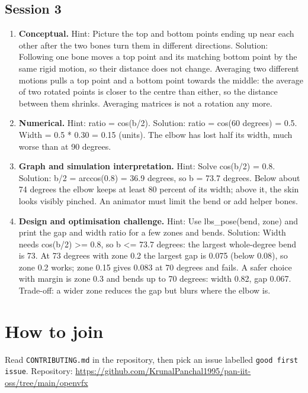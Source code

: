 \documentclass[11pt,a4paper]{article}
\begin{document}
\subsection*{Session 3}
\begin{enumerate}[nosep]
\item \textbf{Conceptual.} Hint: Picture the top and bottom points ending up near each other after the two bones turn them in different directions. Solution: Following one bone moves a top point and its matching bottom point by the same rigid motion, so their distance does not change. Averaging two different motions pulls a top point and a bottom point towards the middle: the average of two rotated points is closer to the centre than either, so the distance between them shrinks. Averaging matrices is not a rotation any more.
\item \textbf{Numerical.} Hint: ratio = cos(b/2). Solution: ratio = cos(60 degrees) = 0.5. Width = 0.5 * 0.30 = 0.15 (units). The elbow has lost half its width, much worse than at 90 degrees.
\item \textbf{Graph and simulation interpretation.} Hint: Solve cos(b/2) = 0.8. Solution: b/2 = arccos(0.8) = 36.9 degrees, so b = 73.7 degrees. Below about 74 degrees the elbow keeps at least 80 percent of its width; above it, the skin looks visibly pinched. An animator must limit the bend or add helper bones.
\item \textbf{Design and optimisation challenge.} Hint: Use lbs\_pose(bend, zone) and print the gap and width ratio for a few zones and bends. Solution: Width needs cos(b/2) \textgreater{}= 0.8, so b \textless{}= 73.7 degrees: the largest whole-degree bend is 73. At 73 degrees with zone 0.2 the largest gap is 0.075 (below 0.08), so zone 0.2 works; zone 0.15 gives 0.083 at 70 degrees and fails. A safer choice with margin is zone 0.3 and bends up to 70 degrees: width 0.82, gap 0.067. Trade-off: a wider zone reduces the gap but blurs where the elbow is.
\end{enumerate}

\section{How to join}
Read \texttt{CONTRIBUTING.md} in the repository, then pick an issue labelled \texttt{good first issue}. Repository: \url{https://github.com/KrunalPanchal1995/pan-iit-oss/tree/main/openvfx}
\end{document}
